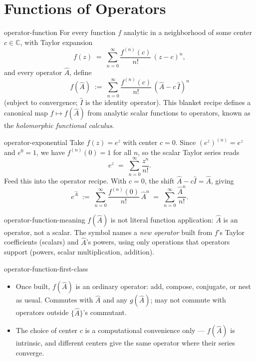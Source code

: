 \documentclass[12pt]{article}
\begin{document}
\section{Functions of Operators}

\begin{dfn}{operator-function}
  For every function $f$ analytic in a neighborhood of some center $c \in \mathbb{C}$, with Taylor expansion
  \[
    f(z) \;=\; \sum_{n=0}^{\infty} \frac{f^{(n)}(c)}{n!}\,(z - c)^n,
  \]
  and every operator $\hat{A}$, define
  \[
    f(\hat{A}) \;:=\; \sum_{n=0}^{\infty} \frac{f^{(n)}(c)}{n!}\,(\hat{A} - c\,\hat{I})^n
  \]
  (subject to convergence; $\hat{I}$ is the identity operator). This blanket recipe defines a canonical map $f \longmapsto f(\hat{A})$ from analytic scalar functions to operators, known as the \emph{holomorphic functional calculus}.
\end{dfn}

\begin{eg}{operator-exponential}
  Take $f(z) = e^z$ with center $c = 0$. Since $(e^z)^{(n)} = e^z$ and $e^0 = 1$, we have $f^{(n)}(0) = 1$ for all $n$, so the scalar Taylor series reads
  \[
    e^{z} \;=\; \sum_{n=0}^{\infty} \frac{z^n}{n!}.
  \]
  Feed this into the operator recipe. With $c = 0$, the shift $\hat{A} - c\hat{I} = \hat{A}$, giving
  \[
    e^{\hat{A}} \;:=\; \sum_{n=0}^{\infty} \frac{f^{(n)}(0)}{n!}\,\hat{A}^n \;=\; \sum_{n=0}^{\infty} \frac{\hat{A}^n}{n!}.
  \]
\end{eg}

\begin{rem}{operator-function-meaning}
  $f(\hat{A})$ is not literal function application: $\hat{A}$ is an operator, not a scalar. The symbol names a \emph{new operator} built from $f$'s Taylor coefficients (scalars) and $\hat{A}$'s powers, using only operations that operators support (powers, scalar multiplication, addition).
\end{rem}

\begin{rem}{operator-function-first-class}
  \begin{itemize}[nosep]
    \item Once built, $f(\hat{A})$ is an ordinary operator: add, compose, conjugate, or nest as usual. Commutes with $\hat{A}$ and any $g(\hat{A})$; may not commute with operators outside $\{\hat{A}\}$'s commutant.
    \item The choice of center $c$ is a computational convenience only --- $f(\hat{A})$ is intrinsic, and different centers give the same operator where their series converge.
  \end{itemize}
\end{rem}
\end{document}
